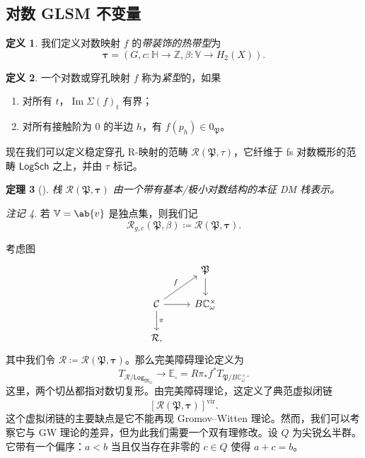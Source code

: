 \documentclass{amsart}
\newtheorem{thm}{定理}[section]
\theoremstyle{definition}
\newtheorem{defn}[thm]{定义}
\theoremstyle{remark}
\newtheorem{rmk}[thm]{注记}
\theoremstyle{plain}
\theoremstyle{definition}
\theoremstyle{remark}
\DeclareMathOperator{\Ima}{Im}
\newcommand{\C}{\mathbb{C}}
\newcommand{\Z}{\mathbb{Z}}
\newcommand{\E}{\mathbb{E}}
\newcommand{\V}{\mathbb{V}}
\renewcommand{\H}{\mathbb{H}}
\newcommand{\mc}[1]{\mathcal{#1}}
\newcommand{\mf}[1]{\mathfrak{#1}}
\newcommand{\mr}[1]{\mathrm{#1}}
\newcommand{\ms}[1]{\mathsf{#1}}
\newcommand{\1}{\mathbf{1}}
\newcommand{\2}{\mathbf{2}}
\newcommand{\3}{\mathbf{3}}
\newcommand{\vir}{\mr{vir}}
\begin{document}
\subsection{对数 GLSM 不变量}%
\label{sub:Log GLSM invariants}

\begin{defn}
    我们定义对数映射 \(f\) 的\textit{带装饰的热带型}为
    \[ \bm{\tau} = (G, c \colon \H \to \Z, \beta \colon \V \to H_2(X)). \]
\end{defn}

\begin{defn}
    一个对数或穿孔映射 \(f\) 称为\textit{紧型}的，如果
    \begin{enumerate}
        \item 对所有 \(t\)，\(\Ima \Sigma(f)_t\) 有界；
        \item 对所有接触阶为 \(0\) 的半边 \(h\)，有 \(f(p_h) \in 0_{\mf{P}}\)。
    \end{enumerate}
\end{defn}

现在我们可以定义稳定穿孔 R-映射的范畴 \(\mc{R}(\mf{P}, \tau)\)，它纤维于 fs 对数概形的范畴 \(\ms{LogSch}\) 之上，并由 \(\tau\) 标记。

\begin{thm}[{\cite{CJR2021,CJRpunctured}}]
    栈 \(\mc{R}(\mf{P},\bm{\tau})\) 由一个带有基本/极小对数结构的本征 DM 栈表示。
\end{thm}

\begin{rmk}
    若 \(\V = \ab\{v\}\) 是独点集，则我们记
    \[ \mc{R}_{g, c}(\mf{P}, \beta) \coloneqq \mc{R}(\mf{P}, \bm{\tau}). \]
\end{rmk}

考虑图
\begin{equation*}
\begin{tikzcd}
    & \mf{P} \ar{d} \\
    \mc{C} \ar{ur}{f} \ar{d}{\pi} \ar{r} & B \C_{\omega}^{\times} \\
    \mc{R},
\end{tikzcd}
\end{equation*}
其中我们令 \(\mc{R} \coloneqq \mc{R}(\mf{P}, \bm{\tau})\)。那么完美障碍理论定义为
\[ T_{\mc{R}/\ms{Log}_{\mf{M}_G}} \to \E_{\square} = R \pi_* f^* T_{\mf{P}/B\C_{\omega}^{\times}}. \]
这里，两个切丛都指对数切复形。由完美障碍理论，这定义了典范虚拟闭链
\[ [\mc{R}(\mf{P}, \bm{\tau})]^{\vir}. \]
这个虚拟闭链的主要缺点是它不能再现 Gromov--Witten 理论。然而，我们可以考察它与 GW 理论的差异，但为此我们需要一个双有理修改。设 \(Q\) 为尖锐幺半群。它带有一个偏序：\(a < b\) 当且仅当存在非零的 \(c \in Q\) 使得 \(a+c = b\)。
\end{document}
